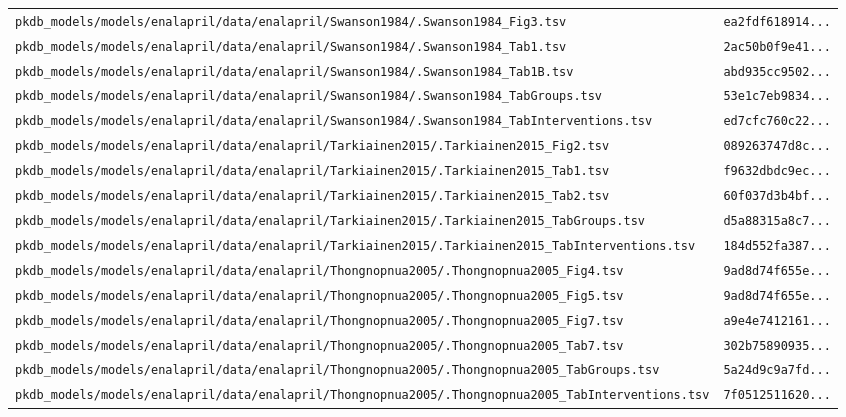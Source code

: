 \begin{longtable}{ll}
\texttt{pkdb\_models/models/enalapril/data/enalapril/Swanson1984/.Swanson1984\_Fig3.tsv} & \texttt{ea2fdf618914...} \\
\texttt{pkdb\_models/models/enalapril/data/enalapril/Swanson1984/.Swanson1984\_Tab1.tsv} & \texttt{2ac50b0f9e41...} \\
\texttt{pkdb\_models/models/enalapril/data/enalapril/Swanson1984/.Swanson1984\_Tab1B.tsv} & \texttt{abd935cc9502...} \\
\texttt{pkdb\_models/models/enalapril/data/enalapril/Swanson1984/.Swanson1984\_TabGroups.tsv} & \texttt{53e1c7eb9834...} \\
\texttt{pkdb\_models/models/enalapril/data/enalapril/Swanson1984/.Swanson1984\_TabInterventions.tsv} & \texttt{ed7cfc760c22...} \\
\texttt{pkdb\_models/models/enalapril/data/enalapril/Tarkiainen2015/.Tarkiainen2015\_Fig2.tsv} & \texttt{089263747d8c...} \\
\texttt{pkdb\_models/models/enalapril/data/enalapril/Tarkiainen2015/.Tarkiainen2015\_Tab1.tsv} & \texttt{f9632dbdc9ec...} \\
\texttt{pkdb\_models/models/enalapril/data/enalapril/Tarkiainen2015/.Tarkiainen2015\_Tab2.tsv} & \texttt{60f037d3b4bf...} \\
\texttt{pkdb\_models/models/enalapril/data/enalapril/Tarkiainen2015/.Tarkiainen2015\_TabGroups.tsv} & \texttt{d5a88315a8c7...} \\
\texttt{pkdb\_models/models/enalapril/data/enalapril/Tarkiainen2015/.Tarkiainen2015\_TabInterventions.tsv} & \texttt{184d552fa387...} \\
\texttt{pkdb\_models/models/enalapril/data/enalapril/Thongnopnua2005/.Thongnopnua2005\_Fig4.tsv} & \texttt{9ad8d74f655e...} \\
\texttt{pkdb\_models/models/enalapril/data/enalapril/Thongnopnua2005/.Thongnopnua2005\_Fig5.tsv} & \texttt{9ad8d74f655e...} \\
\texttt{pkdb\_models/models/enalapril/data/enalapril/Thongnopnua2005/.Thongnopnua2005\_Fig7.tsv} & \texttt{a9e4e7412161...} \\
\texttt{pkdb\_models/models/enalapril/data/enalapril/Thongnopnua2005/.Thongnopnua2005\_Tab7.tsv} & \texttt{302b75890935...} \\
\texttt{pkdb\_models/models/enalapril/data/enalapril/Thongnopnua2005/.Thongnopnua2005\_TabGroups.tsv} & \texttt{5a24d9c9a7fd...} \\
\texttt{pkdb\_models/models/enalapril/data/enalapril/Thongnopnua2005/.Thongnopnua2005\_TabInterventions.tsv} & \texttt{7f0512511620...} \\

\end{longtable}
